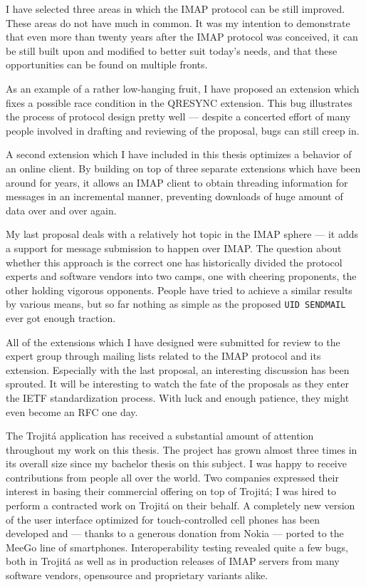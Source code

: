\documentclass[trojita]{subfiles}
\begin{document}
I have selected three areas in which the IMAP protocol can be still improved.  These areas do not have much in common.
It was my intention to demonstrate that even more than twenty years after the IMAP protocol was conceived, it can be
still built upon and modified to better suit today's needs, and that these opportunities can be found on multiple
fronts.

As an example of a rather low-hanging fruit, I have proposed an extension which fixes a possible race condition in the
QRESYNC extension.  This bug illustrates the process of protocol design pretty well --- despite a concerted effort of
many people involved in drafting and reviewing of the proposal, bugs can still creep in.

A second extension which I have included in this thesis optimizes a behavior of an online client.  By building on top of
three separate extensions which have been around for years, it allows an IMAP client to obtain threading information for
messages in an incremental manner, preventing downloads of huge amount of data over and over again.

My last proposal deals with a relatively hot topic in the IMAP sphere --- it adds a support for message submission to
happen over IMAP.  The question about whether this approach is the correct one has historically divided the protocol
experts and software vendors into two camps, one with cheering proponents, the other holding vigorous opponents.  People
have tried to achieve a similar results by various means, but so far nothing as simple as the proposed {\tt UID
SENDMAIL} ever got enough traction.

All of the extensions which I have designed were submitted for review to the expert group through mailing lists related
to the IMAP protocol and its extension.  Especially with the last proposal, an interesting discussion has been sprouted.
It will be interesting to watch the fate of the proposals as they enter the IETF standardization process.  With luck and
enough patience, they might even become an RFC one day.

The Trojitá application has received a substantial amount of attention throughout my work on this thesis.  The project
has grown almost three times in its overall size since my bachelor thesis on this subject.  I was happy to receive
contributions from people all over the world.  Two companies expressed their interest in basing their commercial
offering on top of Trojitá; I was hired to perform a contracted work on Trojitá on their behalf.  A completely new
version of the user interface optimized for touch-controlled cell phones has been developed and --- thanks to a generous
donation from Nokia --- ported to the MeeGo line of smartphones.  Interoperability testing revealed quite a few bugs,
both in Trojitá as well as in production releases of IMAP servers from many software vendors, opensource and proprietary
variants alike.
\end{document}
